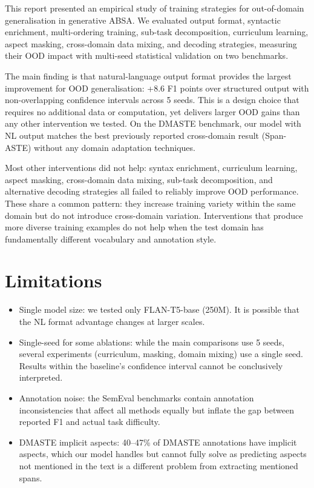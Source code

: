 \documentclass[12pt,a4paper]{report}
\begin{document}
This report presented an empirical study of training strategies for out-of-domain generalisation in generative ABSA. We evaluated output format, syntactic enrichment, multi-ordering training, sub-task decomposition, curriculum learning, aspect masking, cross-domain data mixing, and decoding strategies, measuring their OOD impact with multi-seed statistical validation on two benchmarks.

The main finding is that natural-language output format provides the largest improvement for OOD generalisation: +8.6 F1 points over structured output with non-overlapping confidence intervals across 5 seeds. This is a design choice that requires no additional data or computation, yet delivers larger OOD gains than any other intervention we tested. On the DMASTE benchmark, our model with NL output matches the best previously reported cross-domain result (Span-ASTE) without any domain adaptation techniques.

Most other interventions did not help: syntax enrichment, curriculum learning, aspect masking, cross-domain data mixing, sub-task decomposition, and alternative decoding strategies all failed to reliably improve OOD performance. These share a common pattern: they increase training variety within the same domain but do not introduce cross-domain variation. Interventions that produce more diverse training examples do not help when the test domain has fundamentally different vocabulary and annotation style.

\section{Limitations}

\begin{itemize}
    \item Single model size: we tested only FLAN-T5-base (250M). It is possible that the NL format advantage changes at larger scales.
    \item Single-seed for some ablations: while the main comparisons use 5 seeds, several experiments (curriculum, masking, domain mixing) use a single seed. Results within the baseline's confidence interval cannot be conclusively interpreted.
    \item Annotation noise: the SemEval benchmarks contain annotation inconsistencies that affect all methods equally but inflate the gap between reported F1 and actual task difficulty.
    \item DMASTE implicit aspects: 40--47\% of DMASTE annotations have implicit aspects, which our model handles but cannot fully solve as predicting aspects not mentioned in the text is a different problem from extracting mentioned spans.
\end{itemize}
\end{document}
